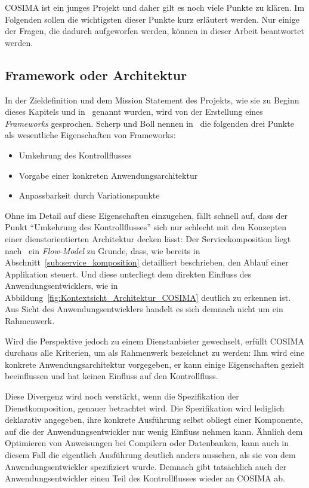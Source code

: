   COSIMA ist ein junges Projekt und daher gilt es noch viele Punkte zu klären. Im Folgenden sollen die wichtigsten dieser Punkte kurz erläutert werden. Nur einige der Fragen, die dadurch aufgeworfen werden, können in dieser Arbeit beantwortet werden.
  
\subsection{Framework oder Architektur} %
\label{sub:framework_oder_architektur}

  In der Zieldefinition und dem Mission Statement des Projekts, wie sie zu Beginn dieses Kapitels und in~\citep{bericht} genannt wurden, wird von der Erstellung eines \emph{Frameworks} gesprochen. Scherp und Boll nennen in~\citep[S. 396f]{scherp2006fe} die folgenden drei Punkte als wesentliche Eigenschaften von Frameworks:
  
  \begin{itemize}
    \item Umkehrung des Kontrollflusses
    \item Vorgabe einer konkreten Anwendungsarchitektur
    \item Anpassbarkeit durch Variationspunkte
  \end{itemize}
  
  Ohne im Detail auf diese Eigenschaften einzugehen, fällt schnell auf, dass der Punkt "`Umkehrung des Kontrollflusses"' sich nur schlecht mit den Konzepten einer dienstorientierten Architektur decken lässt: Der Servicekomposition liegt nach~\citep[S. 320]{web_services_principles_and_technology} ein \emph{Flow-Model} zu Grunde, dass, wie bereits in Abschnitt~\ref{sub:service_komposition} detailliert beschrieben, den Ablauf einer Applikation steuert. Und diese unterliegt dem direkten Einfluss des Anwendungsentwicklers, wie in Abbildung~\ref{fig:Kontextsicht_Architektur_COSIMA} deutlich zu erkennen ist. Aus Sicht des Anwendungsentwicklers handelt es sich demnach nicht um ein Rahmenwerk.
  
  Wird die Perspektive jedoch zu einem Dienstanbieter gewechselt, erfüllt COSIMA durchaus alle Kriterien, um als Rahmenwerk bezeichnet zu werden: Ihm wird eine konkrete Anwendungsarchitektur vorgegeben, er kann einige Eigenschaften gezielt beeinflussen und hat keinen Einfluss auf den Kontrollfluss.
  
  Diese Divergenz wird noch verstärkt, wenn die Spezifikation der Dienstkomposition, genauer betrachtet wird. Die Spezifikation wird lediglich deklarativ angegeben, ihre konkrete Ausführung selbst obliegt einer Komponente, auf die der Anwendungsentwickler nur wenig Einfluss nehmen kann. Ähnlich dem Optimieren von Anweisungen bei Compilern oder Datenbanken, kann auch in diesem Fall die eigentlich Ausführung deutlich anders aussehen, als sie von dem Anwendungsentwickler spezifiziert wurde. Demnach gibt tatsächlich auch der Anwendungsentwickler einen Teil des Kontrollflusses wieder an COSIMA ab.
  
